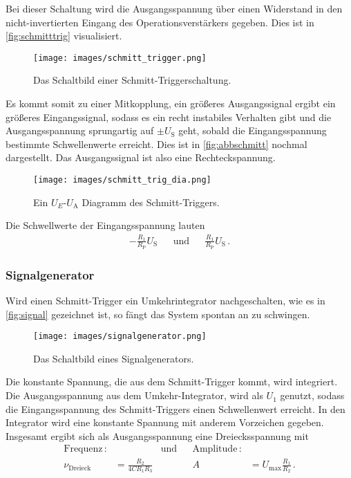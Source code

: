             \noindent 
            Bei dieser Schaltung wird die Ausgangsspannung über einen Widerstand in den nicht-invertierten Eingang des Operationsverstärkers gegeben.
            Dies ist in \autoref{fig:schmitttrig} visualisiert.
            \begin{figure}[H]
                \centering
                \texttt{[image: images/schmitt\_trigger.png]}
                \caption{Das Schaltbild einer Schmitt-Triggerschaltung. \cite{V51}}
                \label{fig:schmitttrig}
            \end{figure}
            \noindent
            Es kommt somit zu einer Mitkopplung, ein größeres Ausgangssignal ergibt ein größeres Eingangssignal, sodass es ein recht instabiles Verhalten gibt 
            und die Ausgangsspannung sprungartig auf $\pm U_\text{S}$ geht, sobald die Eingangsspannung bestimmte Schwellenwerte erreicht. 
            Dies ist in \autoref{fig:abbschmitt} nochmal dargestellt. Das Ausgangssignal ist also eine Rechteckspannung.
            \begin{figure}[H]
                \centering
                \texttt{[image: images/schmitt\_trig\_dia.png]}
                \caption{Ein $U_E$-$U_\text{A}$ Diagramm des Schmitt-Triggers. \cite{Joachim}}
                \label{fig:abbschmitt}
            \end{figure}
            Die Schwellwerte der Eingangsspannung lauten 
            \begin{align*}
                - \frac{R_1}{R_\text{P}} U_\text{S} && \text{und} && \frac{R_1}{R_\text{P}} U_\text{S} \, .
            \end{align*}

        \subsubsection{Signalgenerator}

            \noindent 
            Wird einen Schmitt-Trigger ein Umkehrintegrator nachgeschalten, wie es in \autoref{fig:signal} gezeichnet ist, so fängt das System spontan an zu 
            schwingen. 
            \begin{figure}[H]
                \centering
                \texttt{[image: images/signalgenerator.png]}
                \caption{Das Schaltbild eines Signalgenerators. \cite{V51}}
                \label{fig:signal}
            \end{figure}
            \noindent
            Die konstante Spannung, die aus dem Schmitt-Trigger kommt, wird integriert. 
            Die Ausgangsspannung aus dem Umkehr-Integrator, wird als $U_1$ genutzt, sodass die Eingangsspannung des Schmitt-Triggers einen
            Schwellenwert erreicht. 
            In den Integrator wird eine konstante Spannung mit anderem Vorzeichen gegeben. 
            Insgesamt ergibt sich als Ausgangsspannung eine Dreiecksspannung mit 
            \begin{align*}
                \text{Frequenz}\, : & & \text{und} & & \text{Amplitude}\, :& \\
                \nu_\text{Dreieck} &= \frac{R_2}{4 C R_1 R_3} & & &A &=  U_\text{max} \frac{R_1}{R_2} \, .
            \end{align*}
